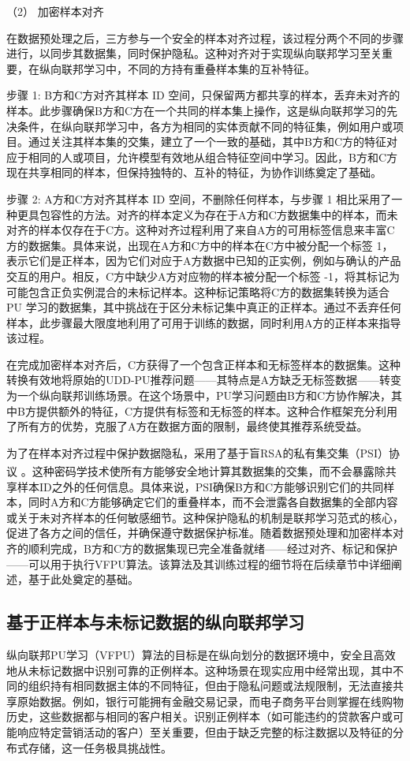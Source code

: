（2） 加密样本对齐

在数据预处理之后，三方参与一个安全的样本对齐过程，该过程分两个不同的步骤进行，以同步其数据集，同时保护隐私。这种对齐对于实现纵向联邦学习至关重要，在纵向联邦学习中，不同的方持有重叠样本集的互补特征。 

步骤 1: B方和C方对齐其样本 ID 空间，只保留两方都共享的样本，丢弃未对齐的样本。此步骤确保B方和C方在一个共同的样本集上操作，这是纵向联邦学习的先决条件，在纵向联邦学习中，各方为相同的实体贡献不同的特征集，例如用户或项目。通过关注其样本集的交集，建立了一个一致的基础，其中B方和C方的特征对应于相同的人或项目，允许模型有效地从组合特征空间中学习。因此，B方和C方现在共享相同的样本，但保持独特的、互补的特征，为协作训练奠定了基础。

步骤 2: A方和C方对齐其样本 ID 空间，不删除任何样本，与步骤 1 相比采用了一种更具包容性的方法。对齐的样本定义为存在于A方和C方数据集中的样本，而未对齐的样本仅存在于C方。这种对齐过程利用了来自A方的可用标签信息来丰富C方的数据集。具体来说，出现在A方和C方中的样本在C方中被分配一个标签 1，表示它们是正样本，因为它们对应于A方数据中已知的正实例，例如与确认的产品交互的用户。相反，C方中缺少A方对应物的样本被分配一个标签 -1，将其标记为可能包含正负实例混合的未标记样本。这种标记策略将C方的数据集转换为适合 PU 学习的数据集，其中挑战在于区分未标记集中真正的正样本。通过不丢弃任何样本，此步骤最大限度地利用了可用于训练的数据，同时利用A方的正样本来指导该过程。

在完成加密样本对齐后，C方获得了一个包含正样本和无标签样本的数据集。这种转换有效地将原始的UDD-PU推荐问题——其特点是A方缺乏无标签数据——转变为一个纵向联邦训练场景。在这个场景中，PU学习问题由B方和C方协作解决，其中B方提供额外的特征，C方提供有标签和无标签的样本。这种合作框架充分利用了所有方的优势，克服了A方在数据方面的限制，最终使其推荐系统受益。

为了在样本对齐过程中保护数据隐私，采用了基于盲RSA的私有集交集（PSI）协议 \textsuperscript{\cite{de2010practical}}。这种密码学技术使所有方能够安全地计算其数据集的交集，而不会暴露除共享样本ID之外的任何信息。具体来说，PSI确保B方和C方能够识别它们的共同样本，同时A方和C方能够确定它们的重叠样本，而不会泄露各自数据集的全部内容或关于未对齐样本的任何敏感细节。这种保护隐私的机制是联邦学习范式的核心，促进了各方之间的信任，并确保遵守数据保护标准。随着数据预处理和加密样本对齐的顺利完成，B方和C方的数据集现已完全准备就绪——经过对齐、标记和保护——可以用于执行VFPU算法。该算法及其训练过程的细节将在后续章节中详细阐述，基于此处奠定的基础。


\subsection{基于正样本与未标记数据的纵向联邦学习}
纵向联邦PU学习（VFPU）算法的目标是在纵向划分的数据环境中，安全且高效地从未标记数据中识别可靠的正例样本。这种场景在现实应用中经常出现，其中不同的组织持有相同数据主体的不同特征，但由于隐私问题或法规限制，无法直接共享原始数据。例如，银行可能拥有金融交易记录，而电子商务平台则掌握在线购物历史，这些数据都与相同的客户相关。识别正例样本（如可能违约的贷款客户或可能响应特定营销活动的客户）至关重要，但由于缺乏完整的标注数据以及特征的分布式存储，这一任务极具挑战性。

